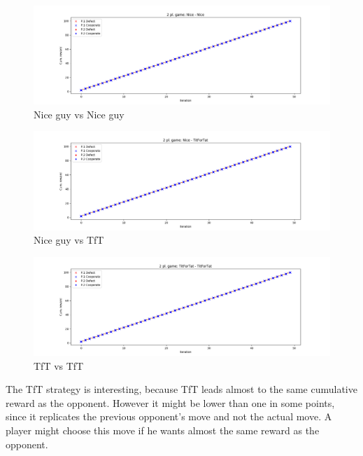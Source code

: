 \documentclass[journal,a4paper,10pt,twoside]{IEEEtran}
\begin{document}
\begin{figure}
    \centering
    \includegraphics[width=1\columnwidth]{../img_v1/idp2p-rewards-Nice-Nice.png}
    \caption{Nice guy vs Nice guy}
    \label{fig:nicevsnice}
\end{figure}

\begin{figure}
    \centering
    \includegraphics[width=1\columnwidth]{../img_v1/idp2p-rewards-Nice-TitForTat.png}
    \caption{Nice guy vs TfT}
    \label{fig:nicevstft}
\end{figure}

\begin{figure}
    \centering
    \includegraphics[width=1\columnwidth]{../img_v1/idp2p-rewards-TitForTat-TitForTat.png}
    \caption{TfT vs TfT}
    \label{fig:tftvstft}
\end{figure}

The TfT strategy is interesting, because TfT leads almost to the same cumulative reward as the opponent. However it might be lower than one in some points, since it replicates the previous opponent's move and not the actual move. A player might choose this move if he wants almost the same reward as the opponent.
\end{document}
